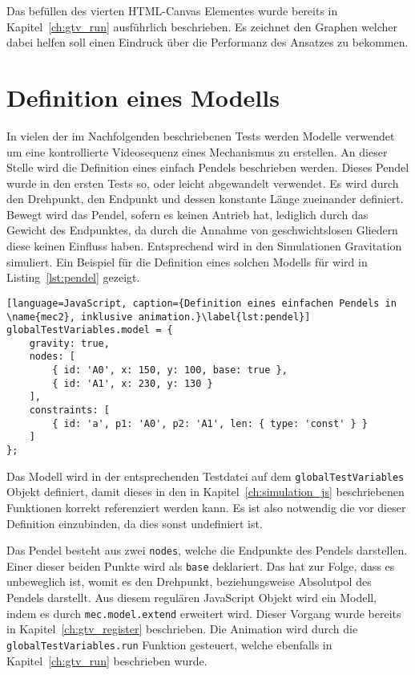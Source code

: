 Das befüllen des vierten HTML-Canvas Elementes wurde bereits in Kapitel~\ref{ch:gtv_run} ausführlich beschrieben.
Es zeichnet den Graphen welcher dabei helfen soll einen Eindruck über die Performanz des Ansatzes zu bekommen.

\section{Definition eines  Modells}

In vielen der im Nachfolgenden beschriebenen Tests werden  Modelle verwendet um eine kontrollierte Videosequenz eines Mechanismus zu erstellen.
An dieser Stelle wird die Definition eines einfach Pendels beschrieben werden.
Dieses Pendel wurde in den ersten Tests so, oder leicht abgewandelt verwendet.
Es wird durch den Drehpunkt, den Endpunkt und dessen konstante Länge zueinander definiert.
Bewegt wird das Pendel, sofern es keinen Antrieb hat, lediglich durch das Gewicht des Endpunktes, da durch die Annahme von geschwichtslosen Gliedern diese keinen Einfluss haben.
Entsprechend wird in den  Simulationen Gravitation simuliert.
Ein Beispiel für die Definition eines solchen Modells für  wird in Listing~\ref{lst:pendel} gezeigt.

\begin{lstlisting}[language=JavaScript, caption={Definition eines einfachen Pendels in \name{mec2}, inklusive animation.}\label{lst:pendel}]
globalTestVariables.model = {
    gravity: true,
    nodes: [
        { id: 'A0', x: 150, y: 100, base: true },
        { id: 'A1', x: 230, y: 130 }
    ],
    constraints: [
        { id: 'a', p1: 'A0', p2: 'A1', len: { type: 'const' } }
    ]
};
\end{lstlisting}

Das  Modell wird in der entsprechenden Testdatei auf dem \lstinline{globalTestVariables} Objekt definiert, damit dieses in den in Kapitel~\ref{ch:simulation_js} beschriebenen Funktionen korrekt referenziert werden kann.
Es ist also notwendig die  vor dieser Definition einzubinden, da dies sonst undefiniert ist.

Das Pendel besteht aus zwei \lstinline{nodes}, welche die Endpunkte des Pendels darstellen.
Einer dieser beiden Punkte wird als \lstinline{base} deklariert.
Das hat zur Folge, dass es unbeweglich ist, womit es den Drehpunkt, beziehungsweise Absolutpol des Pendels darstellt.
Aus diesem regulären JavaScript Objekt wird ein  Modell, indem es durch \lstinline{mec.model.extend} erweitert wird.
Dieser Vorgang wurde bereits in Kapitel~\ref{ch:gtv_register} beschrieben.
Die Animation wird durch die \lstinline{globalTestVariables.run} Funktion gesteuert, welche ebenfalls in Kapitel~\ref{ch:gtv_run} beschrieben wurde.